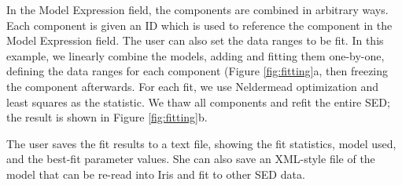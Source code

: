 In the Model Expression field, the components are combined in arbitrary ways. Each component is given an ID which is used to reference the component in the Model Expression field. The user can also set the data ranges to be fit. In this example, we linearly combine the models, adding and fitting them one-by-one, defining the data ranges for each component (Figure \ref{fig:fitting}a, then freezing the component afterwards. For each fit, we use Neldermead optimization and least squares as the statistic. We thaw all components and refit the entire SED; the result is shown in Figure \ref{fig:fitting}b. 

The user saves the fit results to a text file, showing the fit statistics, model used, and the best-fit parameter values. She can also save an XML-style file of the model that can be re-read into Iris and fit to other SED data.